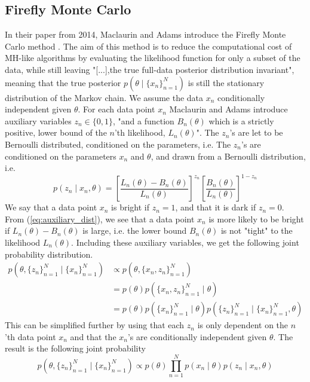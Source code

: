 \documentclass{article}
\theoremstyle{definition}
\begin{document}
\subsection{Firefly Monte Carlo}
In their paper from 2014, Maclaurin and Adams  introduce the Firefly Monte Carlo method \cite{Maclaurin:1}. The aim of this method is to reduce the computational cost of MH-like algorithms by evaluating the likelihood function for only a subset of the data, while still leaving "[...],the true full-data posterior distribution invariant", meaning that the true posterior $p(\theta\mid\{x_n\}_{n=1}^N)$ is still the stationary distribution of the Markov chain.  
We assume the data $x_n$ conditionally independent given $\theta$.
For each data point $x_n$ Maclaurin and Adams introduce auxiliary variables $z_n \in \{0, 1\}$, "and a function $B_n(\theta)$ which is a strictly positive, lower bound of the $n$'th likelihood, $L_n(\theta)$". 
The $z_n$'s are let to be Bernoulli distributed, conditioned on the parameters, i.e.
The $z_n$'s are conditioned on the parameters $x_n$ and $\theta$, and drawn from a Bernoulli distribution, i.e.
\begin{equation}\label{eq:auxiliary_dist}
    p(z_n\mid x_n,\theta) = \left[\frac{L_n(\theta) - B_n(\theta)}{L_n(\theta)}\right]^{z_n}\left[\frac{B_n(\theta)}{L_n(\theta)}\right]^{1-z_n}
\end{equation}
We say that a data point $x_n$ is bright if $z_n = 1$, and that it is dark if $z_n = 0$. From (\ref{eq:auxiliary_dist}), we see that a data point $x_n$ is more likely to be bright if $L_n(\theta) - B_n(\theta)$ is large, i.e. the lower bound $B_n(\theta)$ is not "tight" to the likelihood $L_n(\theta)$. Including these auxiliary variables, we get the following joint probability distribution. 
\begin{equation*}
\begin{split}
     p(\theta, \{z_n\}_{n=1}^N\mid\{x_n\}_{n=1}^N) &\propto p(\theta, \{x_n, z_n\}_{n = 1}^N) \\
     &= p(\theta) p(\{x_n, z_n\}_{n=1}^N\mid\theta) \\
     & = p(\theta)p(\{x_n\}_{n=1}^N\mid\theta)p(\{z_n\}_{n=1}^N\mid \{x_n\}_{n=1}^N, \theta)
\end{split}
\end{equation*}{}
 This can be simplified further by using that each $z_n$ is only dependent on the $n$'th data point $x_n$ and that the $x_n$'s are conditionally independent given $\theta$. The result is the following joint probability 
\begin{equation}\label{eq:joint}
           p(\theta, \{z_n\}_{n=1}^N \mid \{x_n\}_{n=1}^N) \propto p(\theta) \prod_{n=1}^N p(x_n\mid\theta)p(z_n\mid x_n, \theta)
\end{equation}
\end{document}
